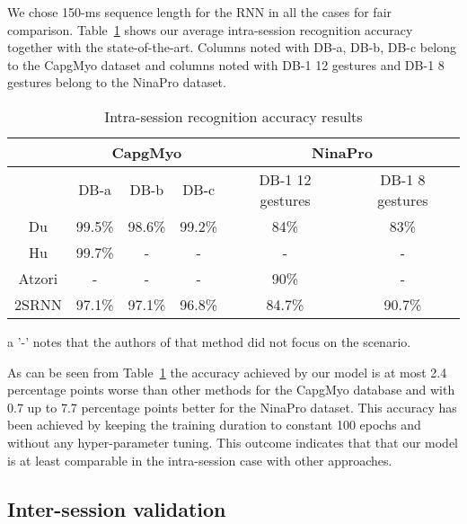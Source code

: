 \documentclass[conference]{IEEEtran}
\begin{document}
{\begin{minipage}{\textwidth}
We chose 150-ms sequence length for the RNN in all the cases for fair comparison. Table~\ref{table:intra-session} shows our average intra-session recognition accuracy together with the state-of-the-art.
Columns noted with DB-a, DB-b, DB-c belong to the CapgMyo dataset and columns noted with DB-1 12 gestures and DB-1 8 gestures belong to the NinaPro dataset.
\begin{table}[tbp]
	\centering
	\begin{threeparttable}
		\setlength{\tabcolsep}{3pt}
		\def\arraystretch{1.5}\begin{tabular}{|c|c|c|c|c|c|} 
			\hline
			& \multicolumn{3}{|c|}{CapgMyo} & \multicolumn{2}{|c|}{NinaPro} \\
			\hline
			& DB-a & DB-b & DB-c & DB-1 12 gestures & DB-1 8 gestures \\
			Du\cite{b18} & 99.5\% & 98.6\% & 99.2\% & 84\% & 83\% \\
			Hu\cite{b19} & 99.7\% & -\tnote{a} & - & - & - \\
			Atzori\cite{b23} & - & - & - & 90\% & - \\
			2SRNN & 97.1\% & 97.1\% & 96.8\% & 84.7\% & 90.7\% \\
			\hline
		\end{tabular}
		\caption{Intra-session recognition accuracy results}
		\begin{tablenotes}
			\item[a] '-' notes that the authors of that method did not focus on the scenario.
		\end{tablenotes}
		\label{table:intra-session}
	\end{threeparttable}
\end{table}
As can be seen from Table~\ref{table:intra-session} the accuracy achieved by our model is at most 2.4 percentage points worse than other methods for the CapgMyo database and with 0.7 up to 7.7 percentage points better for the NinaPro dataset. This accuracy has been achieved by keeping the training duration to constant 100 epochs and without any hyper-parameter tuning. This outcome indicates that that our model is at least comparable in the intra-session case with other approaches.

\subsection{Inter-session validation}


\end{minipage}}
\end{document}
